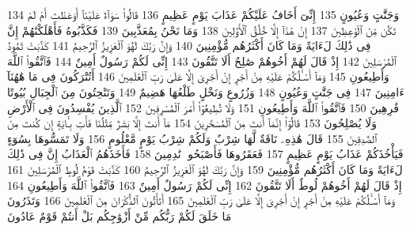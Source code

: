 {\tiny\colorbox{cl_aya}{134}} وَجَنَّٰتٍ وَعُيُونٍ
{\tiny\colorbox{cl_aya}{135}} إِنِّىٓ أَخَافُ عَلَيْكُمْ عَذَابَ يَوْمٍ عَظِيمٍ
{\tiny\colorbox{cl_aya}{136}} قَالُوا۟ سَوَآءٌ عَلَيْنَآ أَوَعَظْتَ أَمْ لَمْ تَكُن مِّنَ ٱلْوَٰعِظِينَ
{\tiny\colorbox{cl_aya}{137}} إِنْ هَٰذَآ إِلَّا خُلُقُ ٱلْأَوَّلِينَ
{\tiny\colorbox{cl_aya}{138}} وَمَا نَحْنُ بِمُعَذَّبِينَ
{\tiny\colorbox{cl_aya}{139}} فَكَذَّبُوهُ فَأَهْلَكْنَٰهُمْ إِنَّ فِى ذَٰلِكَ لَءَايَةً وَمَا كَانَ أَكْثَرُهُم مُّؤْمِنِينَ
{\tiny\colorbox{cl_aya}{140}} وَإِنَّ رَبَّكَ لَهُوَ ٱلْعَزِيزُ ٱلرَّحِيمُ
{\tiny\colorbox{cl_aya}{141}} كَذَّبَتْ ثَمُودُ ٱلْمُرْسَلِينَ
{\tiny\colorbox{cl_aya}{142}} إِذْ قَالَ لَهُمْ أَخُوهُمْ صَٰلِحٌ أَلَا تَتَّقُونَ
{\tiny\colorbox{cl_aya}{143}} إِنِّى لَكُمْ رَسُولٌ أَمِينٌ
{\tiny\colorbox{cl_aya}{144}} فَٱتَّقُوا۟ ٱللَّهَ وَأَطِيعُونِ
{\tiny\colorbox{cl_aya}{145}} وَمَآ أَسْـَٔلُكُمْ عَلَيْهِ مِنْ أَجْرٍ إِنْ أَجْرِىَ إِلَّا عَلَىٰ رَبِّ ٱلْعَٰلَمِينَ
{\tiny\colorbox{cl_aya}{146}} أَتُتْرَكُونَ فِى مَا هَٰهُنَآ ءَامِنِينَ
{\tiny\colorbox{cl_aya}{147}} فِى جَنَّٰتٍ وَعُيُونٍ
{\tiny\colorbox{cl_aya}{148}} وَزُرُوعٍ وَنَخْلٍ طَلْعُهَا هَضِيمٌ
{\tiny\colorbox{cl_aya}{149}} وَتَنْحِتُونَ مِنَ ٱلْجِبَالِ بُيُوتًا فَٰرِهِينَ
{\tiny\colorbox{cl_aya}{150}} فَٱتَّقُوا۟ ٱللَّهَ وَأَطِيعُونِ
{\tiny\colorbox{cl_aya}{151}} وَلَا تُطِيعُوٓا۟ أَمْرَ ٱلْمُسْرِفِينَ
{\tiny\colorbox{cl_aya}{152}} ٱلَّذِينَ يُفْسِدُونَ فِى ٱلْأَرْضِ وَلَا يُصْلِحُونَ
{\tiny\colorbox{cl_aya}{153}} قَالُوٓا۟ إِنَّمَآ أَنتَ مِنَ ٱلْمُسَحَّرِينَ
{\tiny\colorbox{cl_aya}{154}} مَآ أَنتَ إِلَّا بَشَرٌ مِّثْلُنَا فَأْتِ بِـَٔايَةٍ إِن كُنتَ مِنَ ٱلصَّٰدِقِينَ
{\tiny\colorbox{cl_aya}{155}} قَالَ هَٰذِهِۦ نَاقَةٌ لَّهَا شِرْبٌ وَلَكُمْ شِرْبُ يَوْمٍ مَّعْلُومٍ
{\tiny\colorbox{cl_aya}{156}} وَلَا تَمَسُّوهَا بِسُوٓءٍ فَيَأْخُذَكُمْ عَذَابُ يَوْمٍ عَظِيمٍ
{\tiny\colorbox{cl_aya}{157}} فَعَقَرُوهَا فَأَصْبَحُوا۟ نَٰدِمِينَ
{\tiny\colorbox{cl_aya}{158}} فَأَخَذَهُمُ ٱلْعَذَابُ إِنَّ فِى ذَٰلِكَ لَءَايَةً وَمَا كَانَ أَكْثَرُهُم مُّؤْمِنِينَ
{\tiny\colorbox{cl_aya}{159}} وَإِنَّ رَبَّكَ لَهُوَ ٱلْعَزِيزُ ٱلرَّحِيمُ
{\tiny\colorbox{cl_aya}{160}} كَذَّبَتْ قَوْمُ لُوطٍ ٱلْمُرْسَلِينَ
{\tiny\colorbox{cl_aya}{161}} إِذْ قَالَ لَهُمْ أَخُوهُمْ لُوطٌ أَلَا تَتَّقُونَ
{\tiny\colorbox{cl_aya}{162}} إِنِّى لَكُمْ رَسُولٌ أَمِينٌ
{\tiny\colorbox{cl_aya}{163}} فَٱتَّقُوا۟ ٱللَّهَ وَأَطِيعُونِ
{\tiny\colorbox{cl_aya}{164}} وَمَآ أَسْـَٔلُكُمْ عَلَيْهِ مِنْ أَجْرٍ إِنْ أَجْرِىَ إِلَّا عَلَىٰ رَبِّ ٱلْعَٰلَمِينَ
{\tiny\colorbox{cl_aya}{165}} أَتَأْتُونَ ٱلذُّكْرَانَ مِنَ ٱلْعَٰلَمِينَ
{\tiny\colorbox{cl_aya}{166}} وَتَذَرُونَ مَا خَلَقَ لَكُمْ رَبُّكُم مِّنْ أَزْوَٰجِكُم بَلْ أَنتُمْ قَوْمٌ عَادُونَ
